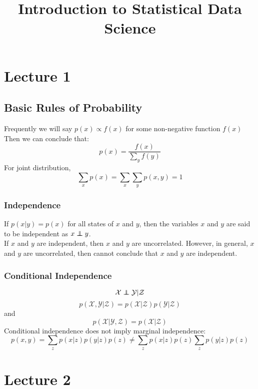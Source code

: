 \documentclass[12pt,a4paper]{article}
\title{Introduction to Statistical Data Science}
\newcommand\independent{\protect\mathpalette{\protect\independenT}{\perp}}
\def\independenT#1#2{\mathrel{\rlap{$#1#2$}\mkern2mu{#1#2}}}
\begin{document}
 

\baselineskip24pt
\maketitle 

\section{Lecture 1}
\subsection*{Basic Rules of Probability}
Frequently we will say $p(x) \propto f(x)$ for some non-negative function $f(x)$\\
Then we can conclude that:
$$
p(x) = \frac{f(x)}{\sum_{y}f(y)}
$$
For joint distribution,
$$
\sum_{x}p(x) = \sum_{x}\sum_{y}p(x,y)=1
$$
\subsubsection*{Independence}
If $p(x|y)=p(x)$ for all states of $x$ and $y$, then the variables $x$ and $y$ are said to be independent as $x \independent y$.\\
If $x$ and $y$ are independent, then $x$ and $y$ are uncorrelated. However, in general, $x$ and $y$ are uncorrelated, then cannot conclude that $x$ and $y$ are independent.\\
\subsubsection*{Conditional Independence}
$$
{\mathcal X} \independent {\mathcal Y}|{\mathcal Z}
$$
$$
p({\mathcal X},{\mathcal Y}|{\mathcal Z}) = p({\mathcal X} |{\mathcal Z})p({\mathcal Y}|{\mathcal Z})
$$ 
and
$$
p({\mathcal X}|{\mathcal Y},{\mathcal Z})=p({\mathcal X}|{\mathcal Z})
$$
Conditional independence does not imply marginal independence:
$$
p(x,y) = \sum_{z}p(x|z)p(y|z)p(z) \neq \sum_{z}p(x|z)p(z) \sum_{z}p(y|z)p(z)
$$
\section{Lecture 2}
\end{document}
